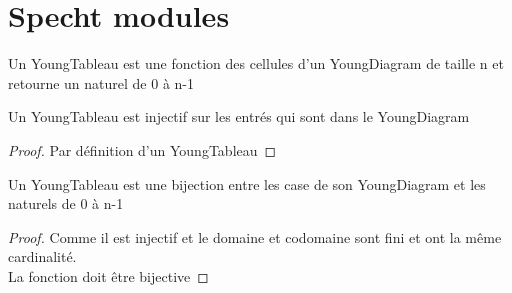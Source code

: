 \chapter{Specht modules}

\begin{definition}[YoungTableau]
    \label{YoungTableau}
    \leanok
    Un YoungTableau est une fonction des cellules d'un YoungDiagram de taille n et retourne un naturel de 0 à n-1
\end{definition}

\begin{theorem}[injYu]
    \label{injYu}
    \leanok
    Un YoungTableau est injectif sur les entrés qui sont dans le YoungDiagram
\end{theorem}
\begin{proof}
    \leanok
    Par définition d'un YoungTableau
\end{proof}


\begin{theorem}[bijYu]
    \label{bijYu}
    \leanok
    Un YoungTableau est une bijection entre les case de son YoungDiagram et les naturels de 0 à n-1
\end{theorem}
\begin{proof}
    \leanok
    Comme il est injectif et le domaine et codomaine sont fini et ont la même cardinalité.\\
    La fonction doit être bijective
\end{proof}
